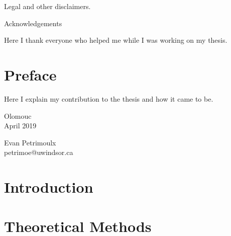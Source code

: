 \documentclass[a4paper,12pt,twoside]{report}
\begin{document}
\vfil
\noindent
Legal and other disclaimers.

\clearpage


\mbox{}
\vfil

\centerline{\Large Acknowledgements}

\bigskip

\noindent
Here I thank everyone who helped me while I was working on my thesis.

\vfil

\clearpage

\pagestyle{fancy}

\tableofcontents
{}

\chapter*{Preface}


Here I explain my contribution to the thesis and how it came to be.

\vspace{1cm}

\noindent
\parbox{.4\textwidth}{
Olomouc
\\
April 2019
}
\hfill
\parbox{.4\textwidth}{\flushright
Evan Petrimoulx
\\
petrimoe@uwindsor.ca
}

\clearpage
\pagestyle{empty}
\cleardoublepage

\pagestyle{fancy}


\chapter{Introduction}
\label{chapter.intro}


\chapter{Theoretical Methods}
\end{document}
